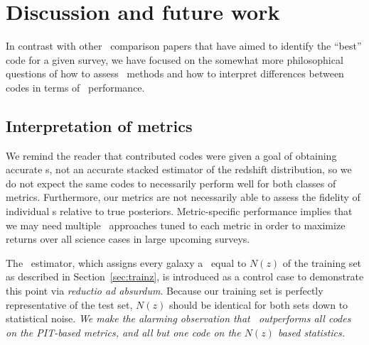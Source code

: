 \section{Discussion and future work}
\label{sec:discussion}



In contrast with other \pzpdf\ comparison papers that have aimed to identify the ``best'' code for a given survey, we have focused on the somewhat more philosophical questions of how to assess \pzpdf\ methods and how to interpret differences between codes in terms of \pzpdf\ performance.

\subsection{Interpretation of metrics}
\label{sec:caution}

We remind the reader that contributed codes were given a goal of obtaining accurate \pzpdf s, not an accurate stacked estimator of the redshift distribution, so we do not expect the same codes to necessarily perform well for both classes of metrics.
Furthermore, our metrics are not necessarily able to assess the fidelity of individual \pzpdf s relative to true posteriors.
Metric-specific performance implies that we may need multiple \pzpdf\ approaches tuned to each metric in order to maximize returns over all science cases in large upcoming surveys.

The \trainz\ estimator, which assigns every galaxy a \pzpdf\ equal to $N(z)$ of the training set as described in Section~\ref{sec:trainz}, is introduced as a control case to demonstrate this point via \textit{reductio ad absurdum}.
Because our training set is perfectly representative of the test set, $N(z)$ should be identical for both sets down to statistical noise.
\textit{We make the alarming observation that \trainz\ outperforms all codes on the PIT-based metrics, and all but one code on the $N(z)$ based statistics.}

